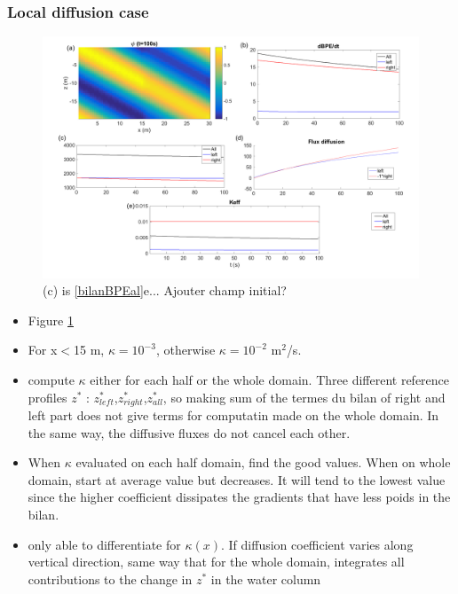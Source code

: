 \subsubsection{Local diffusion case}

\begin{figure}[h!]
\centering
\includegraphics[width=1\textwidth]{./CHAP_BPE/AGBPE_numlab2.png}
\caption{(c) is \ref{bilanBPEal}e... Ajouter champ initial?}
\label{fig2numlab}
\end{figure}

\begin{itemize}
\item Figure \ref{fig2numlab}
\item For x$<$15 m, $\kappa = 10^{-3}$, otherwise $\kappa = 10^{-2}$ m$^2$/s.
\item compute $\kappa$ either for each half or the whole domain. Three different reference profiles $z^*$ : $z^*_{left}$,$z^*_{right}$,$z^*_{all}$, so making sum of the termes du bilan of right and left part does not give terms for computatin made on the whole domain. In the same way, the diffusive fluxes do not cancel each other.
\item When $\kappa$ evaluated on each half domain, find the good values. When on whole domain, start at average value but decreases. It will tend to the lowest value since the higher coefficient dissipates the gradients that have less poids in the bilan.
\item only able to differentiate for $\kappa(x)$. If diffusion coefficient varies along vertical direction, same way that for the whole domain, integrates all contributions to the change in $z^*$ in the water column
\end{itemize}


